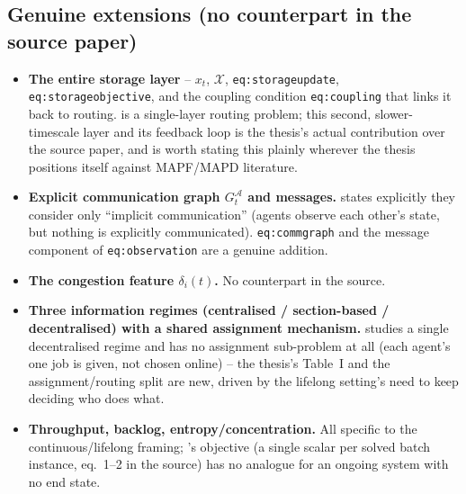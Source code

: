 \documentclass[11pt]{article}
\begin{document}
\subsection{Genuine extensions (no counterpart in the source paper)}
\begin{itemize}
  \item \textbf{The entire storage layer} -- $x_t$, $\mathcal{X}$,
    \texttt{eq:storageupdate}, \texttt{eq:storageobjective}, and the
    coupling condition \texttt{eq:coupling} that links it back to routing.
    \citeauthor{knippenberg2021} is a single-layer routing problem; this
    second, slower-timescale layer and its feedback loop is the thesis's
    actual contribution over the source paper, and is worth stating this
    plainly wherever the thesis positions itself against MAPF/MAPD
    literature.
  \item \textbf{Explicit communication graph $G_t^{\mathcal{A}}$ and
    messages.} \citeauthor{knippenberg2021} states explicitly they consider
    only ``implicit communication'' (agents observe each other's state, but
    nothing is explicitly communicated). \texttt{eq:commgraph} and the
    message component of \texttt{eq:observation} are a genuine addition.
  \item \textbf{The congestion feature $\delta_i(t)$.} No counterpart in
    the source.
  \item \textbf{Three information regimes (centralised / section-based /
    decentralised) with a shared assignment mechanism.}
    \citeauthor{knippenberg2021} studies a single decentralised regime and
    has no assignment sub-problem at all (each agent's one job is given, not
    chosen online) -- the thesis's Table~I and the assignment/routing split
    are new, driven by the lifelong setting's need to keep deciding who does
    what.
  \item \textbf{Throughput, backlog, entropy/concentration.} All specific
    to the continuous/lifelong framing; \citeauthor{knippenberg2021}'s
    objective (a single scalar per solved batch instance, eq.~1--2 in the
    source) has no analogue for an ongoing system with no end state.
\end{itemize}
\end{document}
